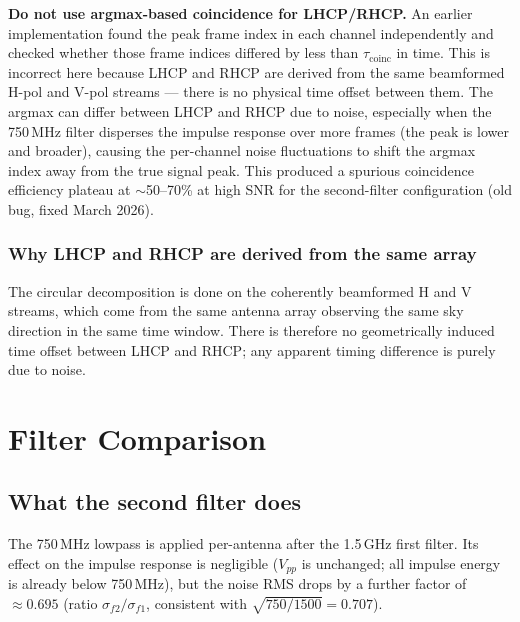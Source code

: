 \documentclass[11pt,letterpaper]{article}
\newenvironment{warningbox}{%
  \begin{mdframed}[backgroundcolor=warningbg,linewidth=1pt,frametitle={\small\textbf{Pitfall / Past Bug}},innerleftmargin=6pt]}%
  {\end{mdframed}}}
\begin{document}
\begin{warningbox}
\textbf{Do not use argmax-based coincidence for LHCP/RHCP.}
An earlier implementation found the peak frame index in each channel
independently and checked whether those frame indices differed by less than
$\tau_\mathrm{coinc}$ in time.  This is incorrect here because LHCP and RHCP
are derived from the same beamformed H-pol and V-pol streams --- there is no
physical time offset between them.  The argmax can differ between LHCP and
RHCP due to noise, especially when the 750\,MHz filter disperses the impulse
response over more frames (the peak is lower and broader), causing the per-channel
noise fluctuations to shift the argmax index away from the true signal peak.
This produced a spurious coincidence efficiency plateau at $\sim$50--70\% at
high SNR for the second-filter configuration (old bug, fixed March 2026).
\end{warningbox}

\subsubsection{Why LHCP and RHCP are derived from the same array}

The circular decomposition is done on the coherently beamformed H and V
streams, which come from the same antenna array observing the same sky
direction in the same time window.  There is therefore no geometrically
induced time offset between LHCP and RHCP; any apparent timing difference is
purely due to noise.

\section{Filter Comparison}

\subsection{What the second filter does}

The 750\,MHz lowpass is applied per-antenna after the 1.5\,GHz first filter.
Its effect on the impulse response is negligible ($V_{pp}$ is unchanged; all
impulse energy is already below 750\,MHz), but the noise RMS drops by a
further factor of $\approx 0.695$ (ratio $\sigma_{f2}/\sigma_{f1}$,
consistent with $\sqrt{750/1500} = 0.707$).
\end{document}
